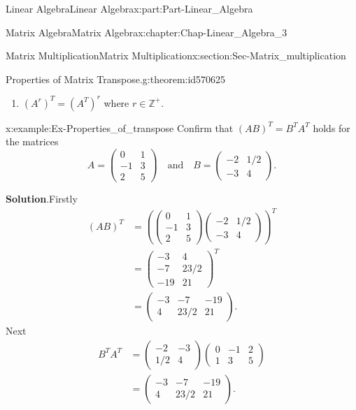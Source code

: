 \documentclass[oneside,10pt,]{book}
\newcommand{\blocktitlefont}{\relax}
\numberwithin{equation}{section}
\newcommand{\amp}{&}
\begin{document}
\begin{partptx}{Linear Algebra}{}{Linear Algebra}{}{}{x:part:Part-Linear_Algebra}
\begin{chapterptx}{Matrix Algebra}{}{Matrix Algebra}{}{}{x:chapter:Chap-Linear_Algebra_3}
\begin{sectionptx}{Matrix Multiplication}{}{Matrix Multiplication}{}{}{x:section:Sec-Matrix_multiplication}
\begin{theorem}{Properties of Matrix Transpose.}{}{g:theorem:id570625}
\begin{enumerate}[label=(\arabic*)]
\item{}\((A^r)^T = (A^T)^r \) where \(r \in \mathbb{Z}^{+}\).%
\end{enumerate}
%
\end{theorem}
\begin{example}{}{x:example:Ex-Properties_of_transpose}%
Confirm that \((AB)^T = B^T A^T\) holds for the matrices%
\begin{equation*}
A = \begin{pmatrix}0 \amp 1\\ -1 \amp 3 \\ 2 \amp 5\end{pmatrix} \quad \mbox{and} \quad B = \begin{pmatrix}-2 \amp 1/2 \\ -3 \amp 4 \end{pmatrix}.
\end{equation*}
%
\par\smallskip%
\noindent\textbf{\blocktitlefont Solution}.\hypertarget{g:solution:id570693}{}\quad{}Firstly%
\begin{align*}
(AB)^T \amp = \left( \begin{pmatrix}0 \amp 1\\ -1 \amp 3 \\ 2 \amp 5\end{pmatrix} \begin{pmatrix}-2 \amp 1/2 \\ -3 \amp 4 \end{pmatrix}\right)^T\\
\amp = \begin{pmatrix}-3 \amp 4 \\ -7 \amp 23/2 \\ -19 \amp 21\end{pmatrix}^T\\
\amp = \begin{pmatrix}-3 \amp -7 \amp -19 \\ 4 \amp 23/2 \amp 21 \end{pmatrix}.
\end{align*}
Next%
\begin{align*}
B^TA^T \amp = \begin{pmatrix}-2 \amp -3 \\ 1/2 \amp 4 \end{pmatrix}  \begin{pmatrix}0 \amp -1 \amp 2\\ 1 \amp 3 \amp 5\end{pmatrix} \\
\amp = \begin{pmatrix}-3 \amp -7 \amp -19 \\ 4 \amp 23/2 \amp 21 \end{pmatrix}.

\end{align*}
\end{example}
\end{sectionptx}
\end{chapterptx}
\end{partptx}
\end{document}
